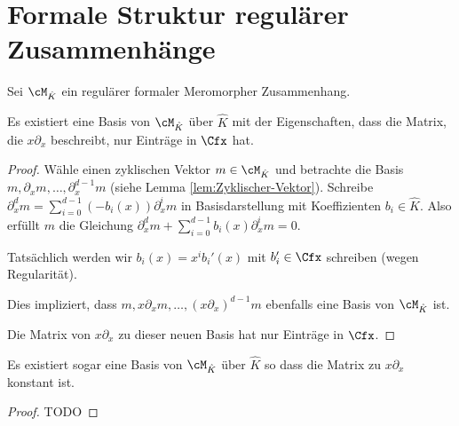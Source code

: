 \section{Formale Struktur regulärer Zusammenhänge}
\cite[Chap 5.2]{sabbah_cimpa90}
Sei $\cM_{\hat K}$ ein regulärer formaler Meromorpher Zusammenhang.
\begin{lem}
\cite[Lem 5.2.1.]{sabbah_cimpa90}
Es existiert eine Basis von $\cM_{\hat K}$ über $\hat K$ mit der Eigenschaften,
dass die Matrix, die $x\partial_x$ beschreibt, nur Einträge in $\Cfx$ hat.
\end{lem}
\begin{proof}
Wähle einen zyklischen Vektor $m\in\cM_{\hat K}$ %
 und betrachte die Basis $m,\partial_x m,\dots,\partial_x^{d-1}m$ (siehe Lemma
\ref{lem:Zyklischer-Vektor}).
Schreibe $\partial_x^dm=\sum_{i=0}^{d-1}(-b_i(x))\partial_x^im$ in
Basisdarstellung mit Koeffizienten $b_i\in\hat K$.
Also erfüllt $m$ die Gleichung
$\partial_x^dm+\sum_{i=0}^{d-1}b_i(x)\partial_x^im=0$.

\begin{comment} bis hier schon klar \end{comment}

Tatsächlich werden wir $b_i(x)=x^ib_i'(x)$ mit $b_i'\in \Cfx$ schreiben (wegen
Regularität).

Dies impliziert, dass $m,x\partial_xm,\dots,(x\partial_x)^{d-1}m$ ebenfalls
eine Basis von $\cM_{\hat K}$ ist.

Die Matrix von $x\partial_x$ zu dieser neuen Basis hat nur Einträge in $\Cfx$.
\end{proof}
\begin{lem}
\cite[Lem 5.2.2.]{sabbah_cimpa90}
Es existiert sogar eine Basis von $\cM_{\hat K}$ über $\hat K$ so dass die
Matrix zu $x\partial_x$ konstant ist.
\end{lem}
\begin{proof}
TODO
\end{proof}

